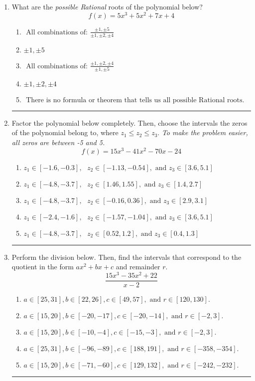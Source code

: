 \documentclass[14pt]{extbook}
\newcommand{\litem}[1]{\item#1\hspace*{-1cm}\rule{\textwidth}{0.4pt}}
\begin{document}
\begin{enumerate}
\litem{
What are the \textit{possible Rational} roots of the polynomial below?\[ f(x) = 5x^{3} +5 x^{2} +7 x + 4 \]\begin{enumerate}[label=\Alph*.]
\item \( \text{ All combinations of: }\frac{\pm 1,\pm 5}{\pm 1,\pm 2,\pm 4} \)
\item \( \pm 1,\pm 5 \)
\item \( \text{ All combinations of: }\frac{\pm 1,\pm 2,\pm 4}{\pm 1,\pm 5} \)
\item \( \pm 1,\pm 2,\pm 4 \)
\item \( \text{ There is no formula or theorem that tells us all possible Rational roots.} \)

\end{enumerate} }
\litem{
Factor the polynomial below completely. Then, choose the intervals the zeros of the polynomial belong to, where $z_1 \leq z_2 \leq z_3$. \textit{To make the problem easier, all zeros are between -5 and 5.}\[ f(x) = 15x^{3} -41 x^{2} -70 x -24 \]\begin{enumerate}[label=\Alph*.]
\item \( z_1 \in [-1.6, -0.3], \text{   }  z_2 \in [-1.13, -0.54], \text{   and   } z_3 \in [3.6, 5.1] \)
\item \( z_1 \in [-4.8, -3.7], \text{   }  z_2 \in [1.46, 1.55], \text{   and   } z_3 \in [1.4, 2.7] \)
\item \( z_1 \in [-4.8, -3.7], \text{   }  z_2 \in [-0.16, 0.36], \text{   and   } z_3 \in [2.9, 3.1] \)
\item \( z_1 \in [-2.4, -1.6], \text{   }  z_2 \in [-1.57, -1.04], \text{   and   } z_3 \in [3.6, 5.1] \)
\item \( z_1 \in [-4.8, -3.7], \text{   }  z_2 \in [0.52, 1.2], \text{   and   } z_3 \in [0.4, 1.3] \)

\end{enumerate} }
\litem{
Perform the division below. Then, find the intervals that correspond to the quotient in the form $ax^2+bx+c$ and remainder $r$.\[ \frac{15x^{3} -35 x^{2} + 22}{x -2} \]\begin{enumerate}[label=\Alph*.]
\item \( a \in [25, 31], b \in [22, 26], c \in [49, 57], \text{ and } r \in [120, 130]. \)
\item \( a \in [15, 20], b \in [-20, -17], c \in [-20, -14], \text{ and } r \in [-2, 3]. \)
\item \( a \in [15, 20], b \in [-10, -4], c \in [-15, -3], \text{ and } r \in [-2, 3]. \)
\item \( a \in [25, 31], b \in [-96, -89], c \in [188, 191], \text{ and } r \in [-358, -354]. \)
\item \( a \in [15, 20], b \in [-71, -60], c \in [129, 132], \text{ and } r \in [-242, -232]. \)


\end{enumerate}}
\end{enumerate}
\end{document}
